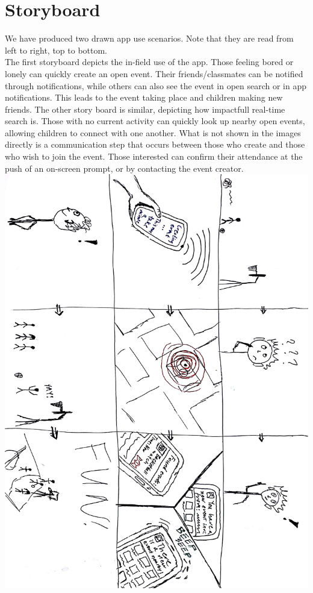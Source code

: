 \documentclass[12pt]{report}
\begin{document}
	\section*{\huge Storyboard}
	We have produced two drawn app use scenarios. Note that they are read from left to right, top to bottom.\\
	The first storyboard depicts the in-field use of the app. Those feeling bored or lonely can quickly create an open event. Their friends/classmates can be notified through notifications, while others can also see the event in open search or in app notifications. This leads to the event taking place and children making new friends. The other story board is similar, depicting how impactfull real-time search is. Those with no current activity can quickly look up nearby open events, allowing children to connect with one another. What is not shown in the images directly is a communication step that occurs between those who create and those who wish to join the event. Those interested can confirm their attendance at the push of an on-screen prompt, or by contacting the event creator.
	\newpage
	\includegraphics[width=\linewidth]{Story1.jpg}\break
\end{document}
